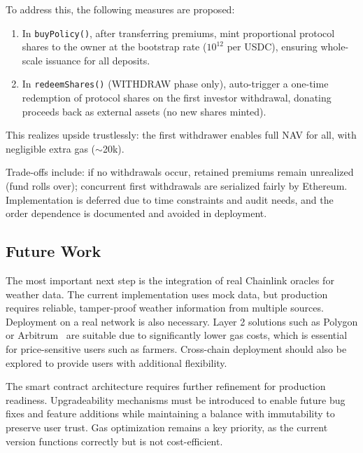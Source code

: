 \documentclass[11pt,a4paper]{article}
\begin{document}
        To address this, the following measures are proposed:
        \begin{enumerate}
        \item In \texttt{buyPolicy()}, after transferring premiums, mint proportional protocol shares to the owner at the bootstrap rate ($10^{12}$ per USDC), ensuring whole-scale issuance for all deposits.
        \item In \texttt{redeemShares()} (WITHDRAW phase only), auto-trigger a one-time redemption of protocol shares on the first investor withdrawal, donating proceeds back as external assets (no new shares minted).
        \end{enumerate}
        This realizes upside trustlessly: the first withdrawer enables full NAV for all, with negligible extra gas ($\sim$20k).

        Trade-offs include: if no withdrawals occur, retained premiums remain unrealized (fund rolls over); concurrent first withdrawals are serialized fairly by Ethereum.
        Implementation is deferred due to time constraints and audit needs, and the order dependence is documented and avoided in deployment.


		\subsection{Future Work}\label{subsec:future-work}
		The most important next step is the integration of real Chainlink oracles for weather data.
		The current implementation uses mock data, but production requires reliable, tamper-proof weather information from multiple sources.
		Deployment on a real network is also necessary.
		Layer 2\footnotemark{} solutions such as Polygon or Arbitrum~\footnotemark{} are suitable due to significantly lower gas costs, which is essential for price-sensitive users such as farmers.
		Cross-chain deployment should also be explored to provide users with additional flexibility.

		The smart contract architecture requires further refinement for production readiness.
		Upgradeability mechanisms must be introduced to enable future bug fixes and feature additions while maintaining a balance with immutability to preserve user trust.
		Gas optimization remains a key priority, as the current version functions correctly but is not cost-efficient.
\end{document}
